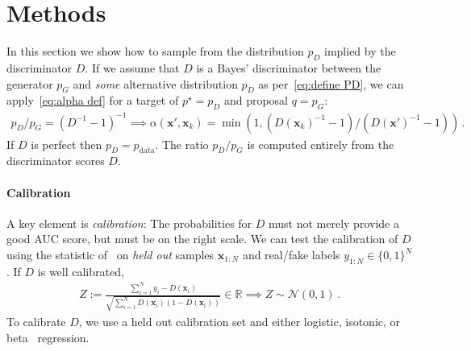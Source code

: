 \documentclass{article}
\renewcommand{\vec}[1]{{\boldsymbol{\mathbf{#1}}}} %
\newcommand{\R}{\mathbb{R}}
\newcommand{\sample}{\sim}
\newcommand{\norm}{\mathcal{N}}
\newcommand{\bern}{\textrm{Bern}}
\newcommand{\target}{{p^\star}}
\newcommand{\prop}{q}
\newcommand{\PG}{{p_G}}
\newcommand{\PD}{{p_D}}
\newcommand{\PR}{{p_{\textrm{data}}}}
\newcommand{\accept}{\alpha}
\begin{document}
\section{Methods}
\label{sec:Methods}

In this section we show how to sample from the distribution $\PD$ implied by the discriminator $D$.
If we assume that $D$ is a Bayes' discriminator between the generator $\PG$ and \emph{some} alternative distribution $\PD$ as per~\eqref{eq:define PD}, we can apply~\eqref{eq:alpha def} for a target of $\target=\PD$ and proposal $\prop=\PG$:
\begin{align}
  \PD/\PG = (D^{-1}-1)^{-1} \implies
  \accept(\vec x', \vec x_k) = \min\left(1, (D(\vec x_k)^{-1} - 1)/(D(\vec x')^{-1} - 1)\right)\,. \label{eq:alpha from D}
\end{align}
If $D$ is perfect then $\PD = \PR$.
The ratio $\PD/\PG$ is computed entirely from the discriminator scores $D$.

\paragraph{Calibration}
A key element is \emph{calibration}: The probabilities for $D$ must not merely provide a good AUC score, but must be on the right scale.
We can test the calibration of $D$ using the statistic of~\citet{Dawid1997} on \emph{held out} samples $\vec x_{1:N}$ and real/fake labels $y_{1:N} \in \{0,1\}^N$.
If $D$ is well calibrated, %
\begin{align}
  Z := \frac{\sum_{i=1}^N y_i - D(\vec x_i)}{\sqrt{\sum_{i=1}^N D(\vec x_i) (1 - D(\vec x_i))}} \in \R \implies Z \sample \norm(0,1)\,. \label{eq:calib score}
\end{align}
To calibrate $D$, we use a held out calibration set and either logistic, isotonic, or beta~\citep{Kull2017} regression.
\end{document}
